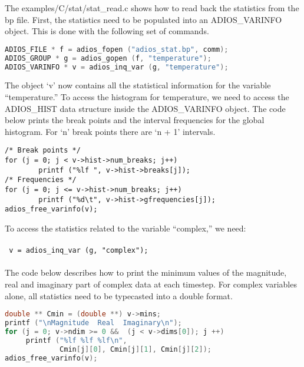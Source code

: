 The examples/C/stat/stat\_read.c shows how to read back the statistics from the 
bp file. First, the statistics need to be populated into an ADIOS\_VARINFO object. 
This is done with the following set of commands.

\begin{lstlisting}[language=C]
ADIOS_FILE * f = adios_fopen ("adios_stat.bp", comm);
ADIOS_GROUP * g = adios_gopen (f, "temperature");
ADIOS_VARINFO * v = adios_inq_var (g, "temperature");
\end{lstlisting}

The object `v' now contains all the statistical information for the variable ``temperature.'' 
To access the histogram for temperature, we need to access the ADIOS\_HIST data 
structure inside the ADIOS\_VARINFO object. The code below prints the break points 
and the interval frequencies for the global histogram. For `n' break points there 
are `n + 1' intervals.

\begin{lstlisting}
/* Break points */
for (j = 0; j < v->hist->num_breaks; j++)
        printf ("%lf ", v->hist->breaks[j]);
/* Frequencies */
for (j = 0; j <= v->hist->num_breaks; j++)
        printf ("%d\t", v->hist->gfrequencies[j]);
adios_free_varinfo(v);
\end{lstlisting}

To access the statistics related to the variable ``complex,'' we need:
\\
\\
\texttt{
v = adios\_inq\_var (g, \texttt{"}complex\texttt{"});
}
\\
\\
The code below describes how to print the minimum values of the magnitude, real 
and imaginary part of complex data at each timestep. For complex variables alone, 
all statistics need to be typecasted into a double format.

\begin{lstlisting}[language=C]
double ** Cmin = (double **) v->mins;
printf ("\nMagnitude  Real  Imaginary\n");
for (j = 0; v->ndim >= 0 &&  (j < v->dims[0]); j ++) 
     printf ("%lf %lf %lf\n", 
             Cmin[j][0], Cmin[j][1], Cmin[j][2]);
adios_free_varinfo(v);
\end{lstlisting}

